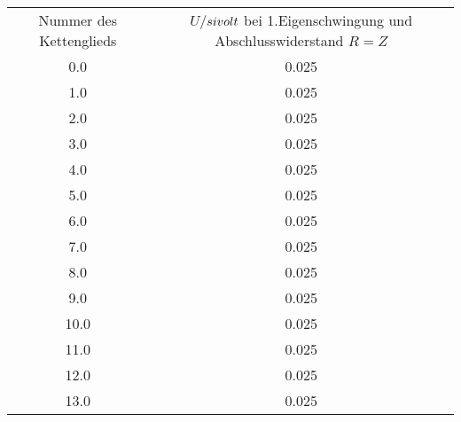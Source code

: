 \begin{table}
\begin{tabular}{cc}
Nummer des Kettenglieds & $U$/$\\si{\\volt}$ bei 1.Eigenschwingung und Abschlusswiderstand $R=Z$ \\
0.0 & 0.025 \\
1.0 & 0.025 \\
2.0 & 0.025 \\
3.0 & 0.025 \\
4.0 & 0.025 \\
5.0 & 0.025 \\
6.0 & 0.025 \\
7.0 & 0.025 \\
8.0 & 0.025 \\
9.0 & 0.025 \\
10.0 & 0.025 \\
11.0 & 0.025 \\
12.0 & 0.025 \\
13.0 & 0.025 \\
\end{tabular}
\end{table}
